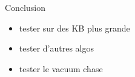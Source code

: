 \begin{frame}{Conclusion}
    \begin{itemize}
        \item tester sur des KB plus grande
        \item tester d'autres algos
        \item tester le vacuum chase
        
    \end{itemize}
\end{frame}